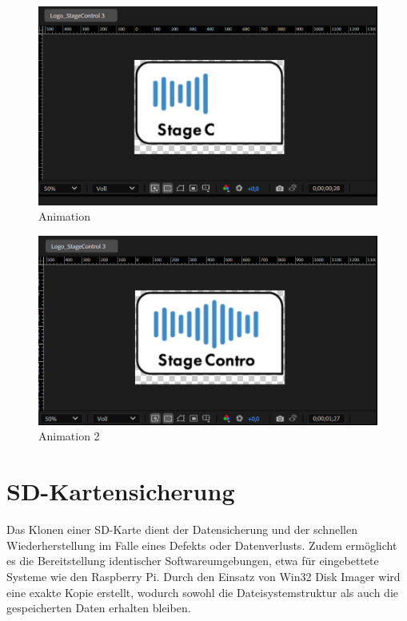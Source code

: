 \begin{figure}[H]
	\centering
	\includegraphics[width=0.7\linewidth]{images/Animation1.png}
	\caption[Animation]{Animation}
	\label{fig:Animation}
\end{figure} 

\begin{figure}[H]
	\centering
	\includegraphics[width=0.7\linewidth]{images/Animation2.png}
	\caption[Animation 2]{Animation 2}
	\label{fig:Animation-2}
\end{figure} 


\newpage
\section{SD-Kartensicherung}
Das Klonen einer SD-Karte dient der Datensicherung und der schnellen Wiederherstellung im Falle eines Defekts oder Datenverlusts. Zudem ermöglicht es die Bereitstellung identischer Softwareumgebungen, etwa für eingebettete Systeme wie den Raspberry Pi. Durch den Einsatz von Win32 Disk Imager wird eine exakte Kopie erstellt, wodurch sowohl die Dateisystemstruktur als auch die gespeicherten Daten erhalten bleiben.

